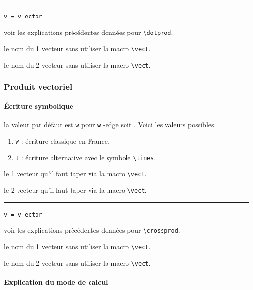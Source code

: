 \documentclass[12pt,a4paper]{book}
\makeatletter
\newcommand\env[1]{\texttt{#1}}
\newcommand\macro[1]{\env{\textbackslash{}#1}}
\theoremstyle{definition}
\newcommand\separation{
	\medskip
	\hfill\rule{0.5\textwidth}{0.75pt}\hfill
	\medskip
}
\newcommand\whyprefix[2]{%
	\textbf{\prefix{#1}}-#2%
}
\newcommand\mwhyprefix[2]{%
	\texttt{#1 = #1-#2}%
}
\newcommand\prefix[1]{%
	\texttt{#1}%
}
\newcommand\inenglish{\@ifstar{\@inenglish@star}{\@inenglish@no@star}}
\newcommand\@inenglish@star[1]{%
	\emph{\og #1 \fg}%
}
\newcommand\@inenglish@no@star[1]{%
	\@inenglish@star{#1} en anglais%
}
\makeatother
\begin{document}
{{\separation


 \hfill \mwhyprefix{v}{ector}

\IDoption{} voir les explications précédentes données pour \macro{dotprod}.

 le nom du 1\ier{} vecteur sans utiliser la macro \macro{vect}.

 le nom du 2\ieme{} vecteur sans utiliser la macro \macro{vect}.


\subsubsection{Produit vectoriel}

\paragraph{Écriture symbolique}




\IDoption{} la valeur par défaut est \verb+w+ pour \whyprefix{w}{edge} soit \inenglish{coin}. Voici les valeurs possibles.

\begin{enumerate}
	\item \verb+w+ : écriture classique en France.

	\item \verb+t+ : écriture alternative avec le symbole \macro{times}.

\end{enumerate}

 le 1\ier{} vecteur qu'il faut taper via la macro \macro{vect}.

 le 2\ieme{} vecteur qu'il faut taper via la macro \macro{vect}.


\separation


 \hfill \mwhyprefix{v}{ector}

\IDoption{} voir les explications précédentes données pour \macro{crossprod}.

 le nom du 1\ier{} vecteur sans utiliser la macro \macro{vect}.

 le nom du 2\ieme{} vecteur sans utiliser la macro \macro{vect}.




\paragraph{Explication du mode de calcul}



}}
\end{document}
